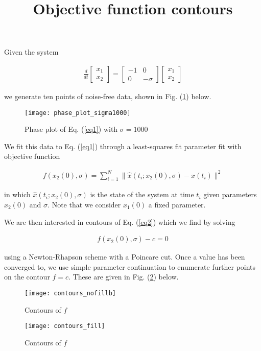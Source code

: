 \documentclass[11pt]{article}
\begin{document}
\title{Objective function contours}
\author{}
\date{}
\maketitle

Given the system

\begin{align}
  \label{eq1}
  \frac{d}{dt} \begin{bmatrix} x_1 \\ x_2 \end{bmatrix} = \begin{bmatrix} -1 & 0 \\ 0 & -\sigma \end{bmatrix} \begin{bmatrix} x_1 \\ x_2 \end{bmatrix}
\end{align}

we generate ten points of noise-free data, shown in Fig. (\ref{fig1}) below.

\begin{figure}[h!]
  \centering
  \texttt{[image: phase\_plot\_sigma1000]}
  \caption{Phase plot of Eq. (\ref{eq1}) with $\sigma=1000$}
  \label{fig1}
\end{figure}

We fit this data to Eq. (\ref{eq1}) through a least-squares fit parameter fit with objective function

\begin{align}
  \label{eq2}
  f(x_2(0), \sigma) = \sum\limits_{i=1}^N \| \hat{x}(t_i; x_2(0), \sigma) - x(t_i) \|^2
\end{align}

in which $\hat{x}(t_i; x_2(0), \sigma)$ is the state of the system at time $t_i$ given parameters $x_2(0)$ and $\sigma$. Note that we consider $x_1(0)$ a fixed parameter.

We are then interested in contours of Eq. (\ref{eq2}) which we find by solving

\begin{align}
  \label{eq3}
  f(x_2(0), \sigma) - c = 0
\end{align}

using a Newton-Rhapson scheme with a Poincare cut. Once a value has been converged to, we use simple parameter continuation to enumerate further points on the contour $f = c$. These are given in Fig. (\ref{fig2}) below.

\begin{landscape}
\begin{figure}[h!]
  \centering
  \centering
  \texttt{[image: contours\_nofillb]}
  \caption{Contours of $f$}
  \label{fig2}
\end{figure}

\begin{figure}[h!]
  \centering
  \texttt{[image: contours\_fill]}
  \caption{Contours of $f$}
  \label{fig3}
\end{figure}
\end{landscape}
\end{document}
